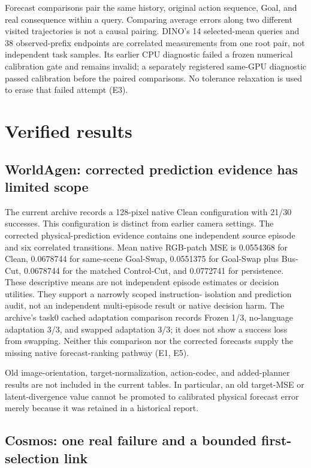 \documentclass[11pt]{article}
\begin{document}
Forecast comparisons pair the same history, original action sequence, Goal,
and real consequence within a query. Comparing average errors along two
different visited trajectories is not a causal pairing. DINO's 14 selected-mean
queries and 38 observed-prefix endpoints are correlated measurements from one
root pair, not independent task samples. Its earlier CPU diagnostic failed a
frozen numerical calibration gate and remains invalid; a separately registered
same-GPU diagnostic passed calibration before the paired comparisons. No
tolerance relaxation is used to erase that failed attempt (E3).

\section{Verified results}

\subsection{WorldAgen: corrected prediction evidence has limited scope}

The current archive records a 128-pixel native Clean configuration with 21/30
successes. This configuration is distinct from earlier camera settings. The
corrected physical-prediction evidence contains one independent source episode
and six correlated transitions. Mean native RGB-patch MSE is 0.0554368 for
Clean, 0.0678744 for same-scene Goal-Swap, 0.0551375 for Goal-Swap plus Bus-Cut,
0.0678744 for the matched Control-Cut, and 0.0772741 for persistence. These
descriptive means are not independent episode estimates or decision utilities.
They support a narrowly scoped instruction-
isolation and prediction audit, not an independent multi-episode result or
native decision harm. The archive's task0 cached adaptation comparison records
Frozen 1/3, no-language adaptation 3/3, and swapped adaptation 3/3; it does not
show a success loss from swapping. Neither this comparison nor the corrected
forecasts supply the missing native forecast-ranking pathway (E1, E5).

Old image-orientation, target-normalization, action-codec, and added-planner
results are not included in the current tables. In particular, an old
target-MSE or latent-divergence value cannot be promoted to calibrated physical
forecast error merely because it was retained in a historical report.

\subsection{Cosmos: one real failure and a bounded first-selection link}
\end{document}
